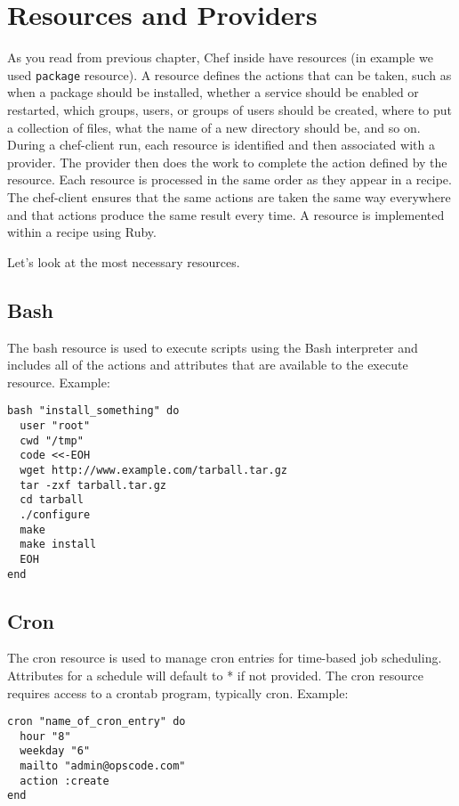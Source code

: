\section{Resources and Providers}
\label{sec:cookbook-resources}

As you read from previous chapter, Chef inside have resources (in example we used \lstinline!package! resource). A resource defines the actions that can be taken, such as when a package should be installed, whether a service should be enabled or restarted, which groups, users, or groups of users should be created, where to put a collection of files, what the name of a new directory should be, and so on. During a chef-client run, each resource is identified and then associated with a provider. The provider then does the work to complete the action defined by the resource. Each resource is processed in the same order as they appear in a recipe. The chef-client ensures that the same actions are taken the same way everywhere and that actions produce the same result every time. A resource is implemented within a recipe using Ruby.

Let's look at the most necessary resources.

\subsection{Bash}

The bash resource is used to execute scripts using the Bash interpreter and includes all of the actions and attributes that are available to the execute resource. Example:

\begin{lstlisting}[label=lst:cookbook-resources-bash]
bash "install_something" do
  user "root"
  cwd "/tmp"
  code <<-EOH
  wget http://www.example.com/tarball.tar.gz
  tar -zxf tarball.tar.gz
  cd tarball
  ./configure
  make
  make install
  EOH
end
\end{lstlisting}

\subsection{Cron}

The cron resource is used to manage cron entries for time-based job scheduling. Attributes for a schedule will default to * if not provided. The cron resource requires access to a crontab program, typically cron. Example:

\begin{lstlisting}[label=lst:cookbook-resources-cron1]
cron "name_of_cron_entry" do
  hour "8"
  weekday "6"
  mailto "admin@opscode.com"
  action :create
end
\end{lstlisting}

